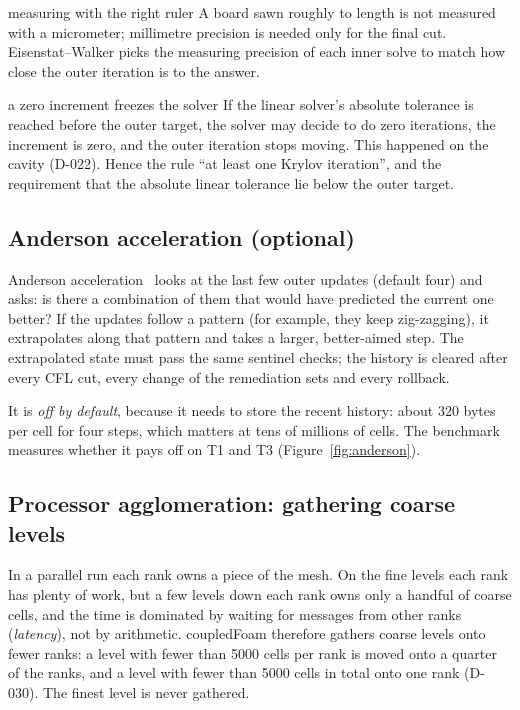 \documentclass[11pt,a4paper]{article}
\begin{document}
\begin{intuition}{measuring with the right ruler}
  A board sawn roughly to length is not measured with a micrometer;
  millimetre precision is needed only for the final cut.
  Eisenstat--Walker picks the measuring precision of each inner solve to
  match how close the outer iteration is to the answer.
\end{intuition}

\begin{pitfall}{a zero increment freezes the solver}
  If the linear solver's absolute tolerance is reached before the outer
  target, the solver may decide to do zero iterations, the increment is
  zero, and the outer iteration stops moving. This happened on the cavity
  (D-022). Hence the rule ``at least one Krylov iteration'', and the
  requirement that the absolute linear tolerance lie below the outer
  target.
\end{pitfall}

\subsection{Anderson acceleration (optional)}\label{sec:anderson}

Anderson acceleration~\cite{Anderson1965,WalkerNi2011} looks at the last
few outer updates (default four) and asks: is there a combination of them
that would have predicted the current one better? If the updates follow a
pattern (for example, they keep zig-zagging), it extrapolates along that
pattern and takes a larger, better-aimed step. The extrapolated state must
pass the same sentinel checks; the history is cleared after every CFL cut,
every change of the remediation sets and every rollback.

It is \emph{off by default}, because it needs to store the recent history:
about 320 bytes per cell for four steps, which matters at tens of millions
of cells. The benchmark measures whether it pays off on T1 and T3
(Figure~\ref{fig:anderson}).

\subsection{Processor agglomeration: gathering coarse levels}\label{sec:procagg}

In a parallel run each rank owns a piece of the mesh. On the fine levels
each rank has plenty of work, but a few levels down each rank owns only a
handful of coarse cells, and the time is dominated by waiting for messages
from other ranks (\emph{latency}), not by arithmetic. coupledFoam therefore
gathers coarse levels onto fewer ranks: a level with fewer than 5000 cells
per rank is moved onto a quarter of the ranks, and a level with fewer than
5000 cells in total onto one rank (D-030). The finest level is never
gathered.
\end{document}
